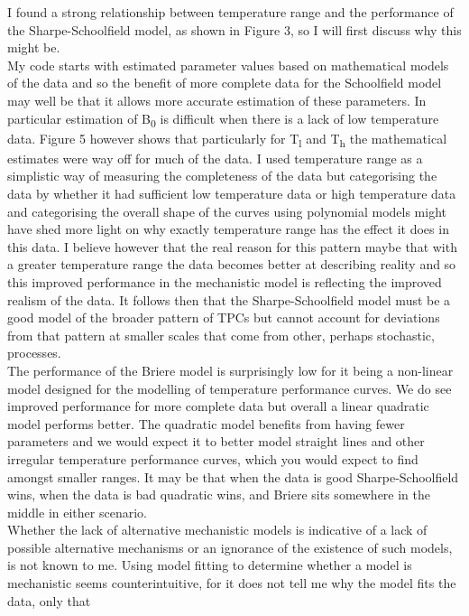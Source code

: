 \documentclass[fontsize=11pt]{scrartcl}\usepackage[]{graphicx}\usepackage[]{color}
\begin{document}
  I found a strong relationship between temperature range and the performance of the Sharpe-Schoolfield model, 
  as shown in Figure 3, so I will first discuss why this might be. \\
  My code starts with estimated parameter values based on mathematical models of the data and 
  so the benefit of more complete data for the Schoolfield model may well be that it allows more 
  accurate estimation of these parameters. In particular estimation of B\textsubscript{0} is 
  difficult when there is a lack of low temperature data.  Figure 5 however shows that particularly for T\textsubscript{l} 
  and T\textsubscript{h} the mathematical estimates were way off for much of the data. I used temperature range as a simplistic way of measuring
  the completeness of the data but categorising the data by whether it had sufficient low temperature data or high temperature data 
  and categorising the overall shape of the curves using polynomial models might have shed more light on why exactly temperature 
  range has the effect it does in this data. I believe however that the real reason for this pattern maybe that with a greater temperature
  range the data becomes better at describing reality and so this improved performance in the mechanistic model is reflecting the
  improved realism of the data. It follows then that the Sharpe-Schoolfield model must be a good model of the broader pattern of 
  TPCs but cannot account for deviations from that pattern at smaller scales that come from other, perhaps stochastic, processes. \\
  The performance of the Briere model is surprisingly low for it being a non-linear model designed
  for the modelling of temperature performance curves. We do see improved performance for more complete data but overall 
  a linear quadratic model performs better. The quadratic model benefits from having fewer parameters and 
  we would expect it to better model straight lines and other irregular temperature performance curves, 
  which you would expect to find amongst smaller ranges. 
  It may be that when the data is good Sharpe-Schoolfield wins, when the data is bad quadratic wins, 
  and Briere sits somewhere in the middle in either scenario.\\
  Whether the lack of alternative mechanistic models is indicative of a lack of possible alternative mechanisms 
  or an ignorance of the existence of such models, is not known to me. Using model fitting to determine whether a 
  model is mechanistic seems counterintuitive, for it does not tell me why the model fits the data, only that 
\end{document}
